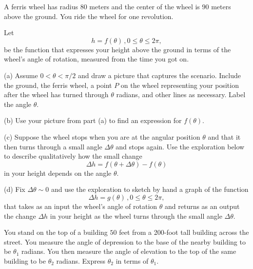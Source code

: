 \documentclass{ximera}
\begin{document}
\begin{question} \label{Q3:RightTriangle}
A ferris wheel has radius $80$ meters and the center of the wheel is $90$ meters above the ground. You ride the wheel for one revolution.

Let 
\[
    h = f(\theta) \, , 0\leq \theta \leq 2\pi ,
\]
be the function that expresses your height above the ground in terms of the wheel's angle of rotation, measured from the time you  got on.

(a)  Assume $0 < \theta < \pi/2$ and draw a picture that captures the scenario. Include the ground, the ferris wheel, a point $P$ on the wheel representing your position after the wheel has turned through $\theta$ radians, and other lines as necessary. Label the angle $\theta$.

(b) Use your picture from part (a) to find an expression for $f(\theta)$.

(c) Suppose the wheel stops when you are at the angular position $\theta$ and that it then turns through a small angle $\Delta \theta$ and stops again.  Use the exploration below to describe qualitatively how the small change
\[
    \Delta h = f(\theta + \Delta \theta) - f(\theta)
\]
in your height depends on the angle $\theta$. 

(d) Fix $\Delta \theta \sim 0$ and use the exploration to sketch by hand a graph of the function 
\[
     \Delta h = g(\theta) \, , 0\leq \theta \leq 2\pi ,
\]
that takes as an input the wheel's angle of rotation $\theta$ and returns as an output the change $\Delta h$
in your height as the wheel turns through the small angle $\Delta \theta$.

\begin{exploration}

 
\begin{onlineOnly}
    \begin{center}
\end{center}
\end{onlineOnly}
\end{exploration} 
\end{question}


\begin{question} \label{Q4:RightTriangle}
You stand on the top of a building $50$ feet from a 200-foot tall building across the street. You measure the angle of depression to the base of the nearby building to be $\theta_1$ radians. You then measure the angle of elevation to the top of the same building to be $\theta_2$ radians. Express $\theta_2$ in terms of $\theta_1$.
\end{question}
\end{document}
